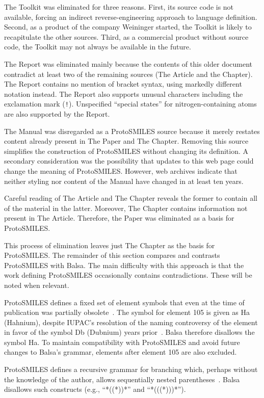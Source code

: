 \documentclass{article}
\def\ttt{\texttt}
\begin{document}
The Toolkit was eliminated for three reasons. First, its source code is not available, forcing an indirect reverse-engineering approach to language definition. Second, as a product of the company Weininger started, the Toolkit is likely to recapitulate the other sources. Third, as a commercial product without source code, the Toolkit may not always be available in the future.

The Report was eliminated mainly because the contents of this older document contradict at least two of the remaining sources (The Article and the Chapter). The Report contains no mention of bracket syntax, using markedly different notation instead. The Report also supports unusual characters including the exclamation mark (\ttt{!}). Unspecified \enquote{special states} for nitrogen-containing atoms are also supported by the Report.

The Manual was disregarded as a ProtoSMILES source because it merely restates content already present in The Paper and The Chapter. Removing this source simplifies the construction of ProtoSMILES without changing its definition. A secondary consideration was the possibility that updates to this web page could change the meaning of ProtoSMILES. However, web archives indicate that neither styling nor content of the Manual have changed in at least ten years.

Careful reading of The Article and The Chapter reveals the former to contain all of the material in the latter. Moreover, The Chapter contains information not present in The Article. Therefore, the Paper was eliminated as a basis for ProtoSMILES.

This process of elimination leaves just The Chapter as the basis for ProtoSMILES. The remainder of this section compares and contrasts ProtoSMILES with Balsa. The main difficulty with this approach is that the work defining ProtoSMILES occasionally contains contradictions. These will be noted when relevant.

ProtoSMILES defines a fixed set of element symbols that even at the time of publication was partially obsolete~\cite[p.~83]{weininger:2003}. The symbol for element 105 is given as Ha (Hahnium), despite IUPAC's resolution of the naming controversy of the element in favor of the symbol Db (Dubnium) years prior~\cite{sageson:1997}. Balsa therefore disallows the symbol Ha. To maintain compatibility with ProtoSMILES and avoid future changes to Balsa's grammar, elements after element 105 are also excluded.

ProtoSMILES defines a recursive grammar for branching which, perhaps without the knowledge of the author, allows sequentially nested parentheses~\cite[p.~86]{weininger:2003}. Balsa disallows such constructs (e.g., \enquote{*((*))*} and \enquote{*(((*)))*}).
\end{document}
